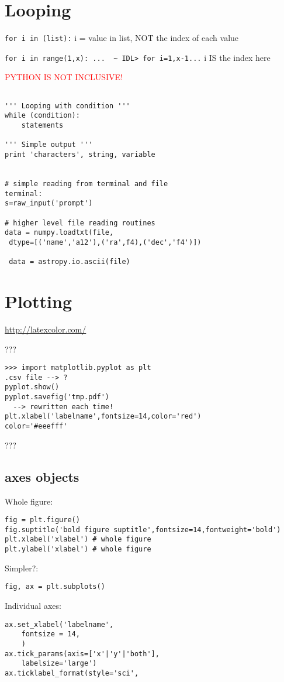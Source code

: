 \documentclass{article}
\begin{document}
\section*{Looping}
\verb|for i in (list):| i = value in list, NOT the index of each value

\verb|for i in range(1,x): ...  ~ IDL> for i=1,x-1...| i IS the index here

\textcolor{red}{PYTHON IS NOT INCLUSIVE!}

\begin{verbatim}

''' Looping with condition '''
while (condition):
    statements

''' Simple output '''
print 'characters', string, variable


# simple reading from terminal and file
terminal:
s=raw_input('prompt')

# higher level file reading routines
data = numpy.loadtxt(file,
 dtype=[('name','a12'),('ra',f4),('dec','f4')])

 data = astropy.io.ascii(file)

\end{verbatim}

\section*{Plotting}
\url{http://latexcolor.com/}

???
\begin{verbatim}
>>> import matplotlib.pyplot as plt
.csv file --> ?
pyplot.show()
pyplot.savefig('tmp.pdf')
  --> rewritten each time!
plt.xlabel('labelname',fontsize=14,color='red')
color='#eeefff'
\end{verbatim}
???

\subsection*{axes objects}
Whole figure:
\begin{verbatim}
fig = plt.figure()
fig.suptitle('bold figure suptitle',fontsize=14,fontweight='bold')
plt.xlabel('xlabel') # whole figure
plt.ylabel('xlabel') # whole figure
\end{verbatim}

Simpler?:
\begin{verbatim}
fig, ax = plt.subplots()
\end{verbatim}

Individual axes:
\begin{verbatim}
ax.set_xlabel('labelname',
    fontsize = 14,
    )
ax.tick_params(axis=['x'|'y'|'both'],
    labelsize='large')
ax.ticklabel_format(style='sci',
\end{verbatim}
\end{document}
